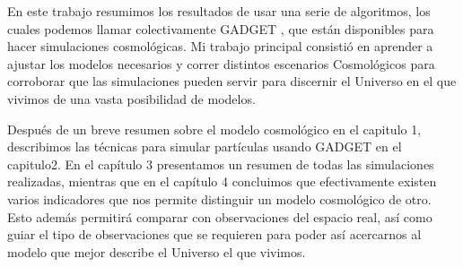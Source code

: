 En este trabajo resumimos los resultados de usar una serie de algoritmos, los cuales  podemos llamar colectivamente GADGET \cite{2001NewA....6...79S}, que están disponibles para hacer simulaciones cosmológicas. Mi trabajo principal consistió en aprender a ajustar los modelos necesarios y correr distintos escenarios Cosmológicos para corroborar que las simulaciones pueden servir para discernir el Universo en el que vivimos de una vasta posibilidad de modelos.

Después de un breve resumen sobre el modelo cosmológico en el capitulo 1, describimos las técnicas para simular partículas usando GADGET en el capitulo2. En el capítulo 3 presentamos un resumen de todas las simulaciones realizadas, mientras que en el capítulo 4 concluimos que efectivamente existen varios indicadores que nos permite distinguir un modelo cosmológico de otro. Esto además permitirá comparar con observaciones del espacio real, así como guiar el tipo de observaciones que se requieren para poder así acercarnos al modelo que mejor describe el Universo el que vivimos.









\lhead[\fancyplain{}{}]%
      {\fancyplain{}{\bfseries\rightmark}}
